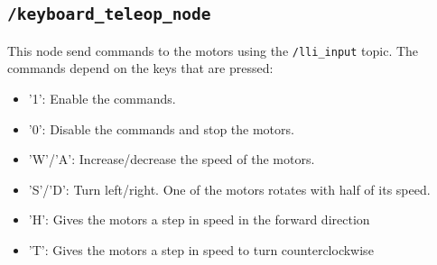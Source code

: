 \subsection*{\lstinline[style=cinline]{/keyboard_teleop_node}}
This node send commands to the motors using the \lstinline[style=cinline]{/lli_input} topic. The commands depend on the keys that are pressed:
\begin{itemize}
    \item '1': Enable the commands.
    \item '0': Disable the commands and stop the motors.
    \item 'W'/'A': Increase/decrease the speed of the motors.
    \item 'S'/'D': Turn left/right. One of the motors rotates with half of its speed.
    \item 'H': Gives the motors a step in speed in the forward direction
    \item 'T': Gives the motors a step in speed to turn counterclockwise
\end{itemize}


